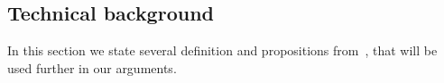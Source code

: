 \subsection{Technical background}
\label{app:technical}
In this section we state several definition and propositions from~\cite{nourdin2012normal}, that will be used further in our arguments.
